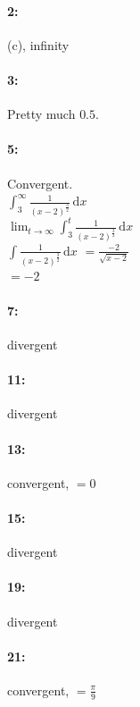 \documentclass[12pt]{article}
\newcommand{\dx}{\mathrm{d}x}
\begin{document}
    \paragraph{2:\\}
    (c), infinity
    \paragraph{3:\\}
    Pretty much $0.5$. 
    \paragraph{5:\\}
    Convergent. \\
    $\int_{3}^{\infty} \! \frac{1}{(x-2)^{\frac{3}{2}}}\,\dx$\\
    $\lim_{t\to\infty} \int_{3}^{t} \! \frac{1}{(x-2)^{\frac{3}{2}}}\,\dx$\\
    $\int\!\frac{1}{(x-2)^{\frac{3}{2}}}\,\dx$
    $= \frac{-2}{\sqrt{x-2}}$\\
    $=-2$\\
    \paragraph{7:\\}
    divergent
    \paragraph{11:\\}
    divergent
    \paragraph{13:\\}
    convergent, $=0$

    \paragraph{15:\\}
    divergent
    \paragraph{19:\\}
    divergent
    \paragraph{21:\\}
    convergent, $=\frac{\pi}{9}$
\end{document}
